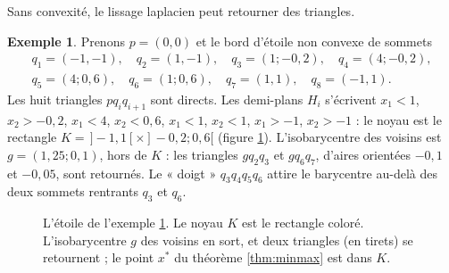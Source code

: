 \documentclass[11pt,a4paper]{article}
\theoremstyle{plain}
\theoremstyle{definition}
\newtheorem{exemple}[theoreme]{Exemple}
\theoremstyle{remark}
\begin{document}
Sans convexité, le lissage laplacien peut retourner des triangles.

\begin{exemple}\label{ex:etoile}
Prenons $p=(0,0)$ et le bord d'étoile non convexe de sommets
\begin{gather*}
  q_1=(-1,-1),\quad q_2=(1,-1),\quad q_3=(1;-0{,}2),\quad q_4=(4;-0{,}2),\\
  q_5=(4;0{,}6),\quad q_6=(1;0{,}6),\quad q_7=(1,1),\quad q_8=(-1,1).
\end{gather*}
Les huit triangles $pq_iq_{i+1}$ sont directs. Les demi-plans $H_i$ s'écrivent $x_1<1$, $x_2>-0{,}2$, $x_1<4$, $x_2<0{,}6$, $x_1<1$, $x_2<1$, $x_1>-1$, $x_2>-1$ : le noyau est le rectangle $K=\,]-1,1[\times]-0{,}2;0{,}6[$ (figure \ref{fig:etoile}). L'isobarycentre des voisins est $g=(1{,}25;0{,}1)$, hors de $K$ : les triangles $gq_2q_3$ et $gq_6q_7$, d'aires orientées $-0{,}1$ et $-0{,}05$, sont retournés. Le « doigt » $q_3q_4q_5q_6$ attire le barycentre au-delà des deux sommets rentrants $q_3$ et $q_6$.
\end{exemple}

\begin{figure}[h]
\centering
{}
\caption{L'étoile de l'exemple \ref{ex:etoile}. Le noyau $K$ est le rectangle coloré. L'isobarycentre $g$ des voisins en sort, et deux triangles (en tirets) se retournent ; le point $x^*$ du théorème \ref{thm:minmax} est dans $K$.}\label{fig:etoile}
\end{figure}
\end{document}

